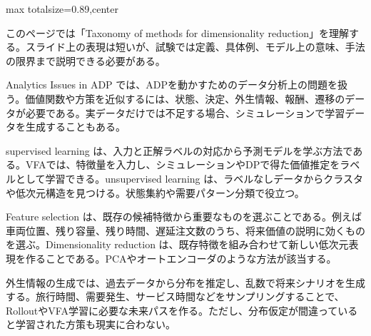 \begin{minipage}[t]{0.58\textwidth}
\begin{adjustbox}{max totalsize={\textwidth}{0.89\textheight},center}
\begin{minipage}{\textwidth}\scriptsize
{}このページでは「Taxonomy of methods for dimensionality reduction」を理解する。スライド上の表現は短いが、試験では定義、具体例、モデル上の意味、手法の限界まで説明できる必要がある。\par
Analytics Issues in ADP では、ADPを動かすためのデータ分析上の問題を扱う。価値関数や方策を近似するには、状態、決定、外生情報、報酬、遷移のデータが必要である。実データだけでは不足する場合、シミュレーションで学習データを生成することもある。\par
supervised learning は、入力と正解ラベルの対応から予測モデルを学ぶ方法である。VFAでは、特徴量を入力し、シミュレーションやDPで得た価値推定をラベルとして学習できる。unsupervised learning は、ラベルなしデータからクラスタや低次元構造を見つける。状態集約や需要パターン分類で役立つ。\par
Feature selection は、既存の候補特徴から重要なものを選ぶことである。例えば車両位置、残り容量、残り時間、遅延注文数のうち、将来価値の説明に効くものを選ぶ。Dimensionality reduction は、既存特徴を組み合わせて新しい低次元表現を作ることである。PCAやオートエンコーダのような方法が該当する。\par
外生情報の生成では、過去データから分布を推定し、乱数で将来シナリオを生成する。旅行時間、需要発生、サービス時間などをサンプリングすることで、RolloutやVFA学習に必要な未来パスを作る。ただし、分布仮定が間違っていると学習された方策も現実に合わない。\par

\end{minipage}
\end{adjustbox}
\end{minipage}
